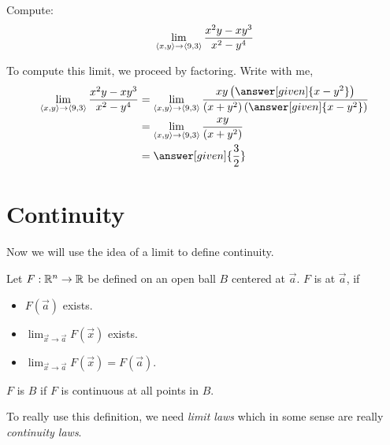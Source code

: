 \documentclass{ximera}
\begin{document}
\begin{example}
  Compute:
  \[
  \lim_{\left\langle x,y\right\rangle\to\left\langle 9,3\right\rangle} \frac{x^2y-xy^3}{x^2-y^4}
  \]
  \begin{explanation}
    To compute this limit, we proceed by factoring. Write with me,
    \begin{align*}
      \lim_{\vector{x,y}\to\vector{9,3}} \frac{x^2y-xy^3}{x^2-y^4}
      &=\lim_{\vector{x,y}\to\vector{9,3}} \frac{xy\left(\answer[given]{x-y^2}\right)}{(x+y^2)\left(\answer[given]{x-y^2}\right)}\\
      &=\lim_{\vector{x,y}\to\vector{9,3}} \frac{xy}{(x+y^2)}\\
      &=\answer[given]{\frac{3}{2}}
    \end{align*}
  \end{explanation}
\end{example}



\section{Continuity}

Now we will use the idea of a limit to define continuity.

\begin{definition}
  Let $F:\mathbb R^n\to \mathbb R$ be defined on an open ball $B$ centered at
  $\vec{a}$. $F$ is  at $\vec{a}$, if
  \begin{itemize}
  \item $F(\vec{a})$ exists.
  \item $\lim_{\vec{x}\to\vec{a}} F(\vec{x})$ exists.
  \item $\lim_{\vec{x}\to\vec{a}} F(\vec{x}) = F(\vec{a}).$
  \end{itemize}
  $F$ is  $B$ if $F$ is continuous at
  all points in $B$.
\end{definition}

To really use this definition, we need \textit{limit laws} which in
some sense are really \textit{continuity laws}.
\end{document}
